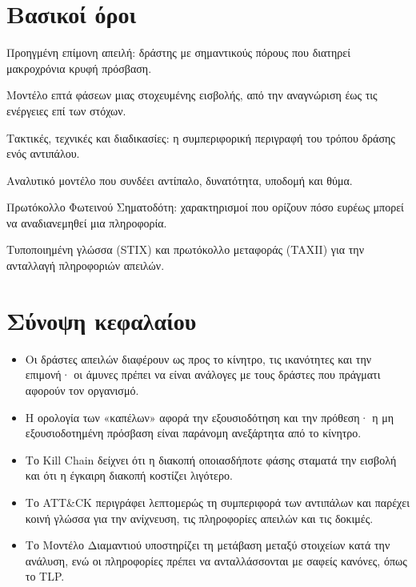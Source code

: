 \section*{Βασικοί όροι}
\begin{description}[style=nextline,leftmargin=1.2em]
  \item[APT] Προηγμένη επίμονη απειλή: δράστης με σημαντικούς πόρους που διατηρεί μακροχρόνια κρυφή πρόσβαση.
  \item[Kill Chain] Μοντέλο επτά φάσεων μιας στοχευμένης εισβολής, από την αναγνώριση έως τις ενέργειες επί των στόχων.
  \item[TTP] Τακτικές, τεχνικές και διαδικασίες: η συμπεριφορική περιγραφή του τρόπου δράσης ενός αντιπάλου.
  \item[Μοντέλο Διαμαντιού] Αναλυτικό μοντέλο που συνδέει αντίπαλο, δυνατότητα, υποδομή και θύμα.
  \item[TLP] Πρωτόκολλο Φωτεινού Σηματοδότη: χαρακτηρισμοί που ορίζουν πόσο ευρέως μπορεί να αναδιανεμηθεί μια πληροφορία.
  \item[STIX / TAXII] Τυποποιημένη γλώσσα (STIX) και πρωτόκολλο μεταφοράς (TAXII) για την ανταλλαγή πληροφοριών απειλών.
\end{description}

\section*{Σύνοψη κεφαλαίου}
\begin{itemize}
  \item Οι δράστες απειλών διαφέρουν ως προς το κίνητρο, τις ικανότητες και την επιμονή· οι άμυνες πρέπει να είναι ανάλογες με τους δράστες που πράγματι αφορούν τον οργανισμό.
  \item Η ορολογία των «καπέλων» αφορά την εξουσιοδότηση και την πρόθεση· η μη εξουσιοδοτημένη πρόσβαση είναι παράνομη ανεξάρτητα από το κίνητρο.
  \item Το Kill Chain δείχνει ότι η διακοπή οποιασδήποτε φάσης σταματά την εισβολή και ότι η έγκαιρη διακοπή κοστίζει λιγότερο.
  \item Το ATT\&CK περιγράφει λεπτομερώς τη συμπεριφορά των αντιπάλων και παρέχει κοινή γλώσσα για την ανίχνευση, τις πληροφορίες απειλών και τις δοκιμές.
  \item Το Μοντέλο Διαμαντιού υποστηρίζει τη μετάβαση μεταξύ στοιχείων κατά την ανάλυση, ενώ οι πληροφορίες πρέπει να ανταλλάσσονται με σαφείς κανόνες, όπως το TLP.
\end{itemize}

